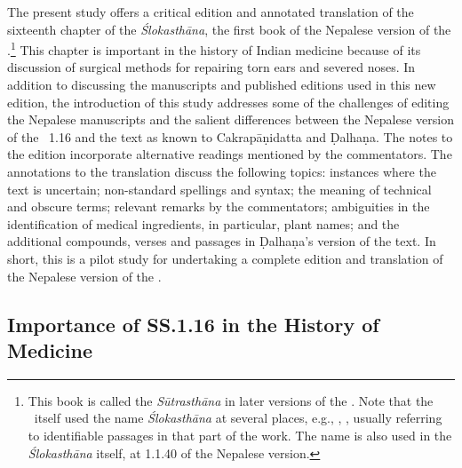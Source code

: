 The present study offers a critical edition and annotated translation of the
sixteenth chapter of the \emph{Ślokasthāna}, the first book of the Nepalese
version of the \SS.\footnote{This book is called the \emph{Sūtrasthāna} in later
    versions of the \SS.  Note that the \SS\ itself used the name \emph{Ślokasthāna}
    at several places, e.g., , , usually
    referring to identifiable passages in that part of the work. The name is also used
    in the \emph{Ślokasthāna} itself, at 1.1.40 of the Nepalese version.} 
%  
This chapter is important in the history of Indian medicine because of its
discussion of surgical methods for repairing torn ears and severed noses. In
addition to discussing the manuscripts and published editions used in this new
edition, the introduction of this study addresses some of the challenges of
editing the Nepalese manuscripts and the salient differences between the Nepalese
version of the \SS\ 1.16 and the text as known to Cakrapāṇidatta and Ḍalhaṇa. The
notes to the edition incorporate alternative readings mentioned by the
commentators.  The annotations to the translation discuss the following topics:
instances where the text is uncertain; non-standard spellings and syntax; the
meaning of technical and obscure terms; relevant remarks by the commentators;
ambiguities in the identification of medical ingredients, in particular, plant
names; and the additional compounds, verses and passages in Ḍalhaṇa's version of
the text. In short, this is a pilot study for undertaking a complete edition and
translation of the Nepalese version of the \SS.


\subsection{Importance of SS.1.16 in the History of Medicine}


